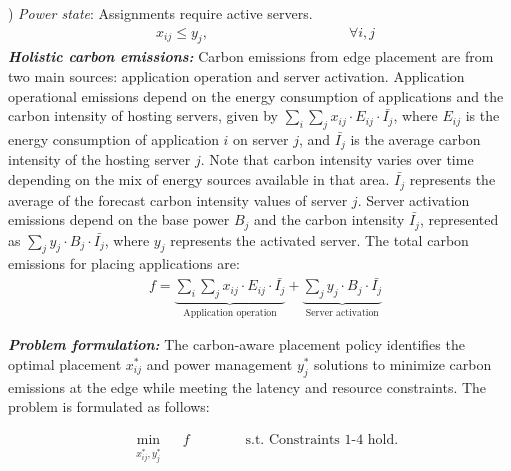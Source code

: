 ) \textit{Power state}: 
Assignments require active servers.  
{\small 
\begin{align}
    \label{eq:server_on}
    & x_{ij} \leq y_j, \quad \quad \quad \quad \quad  \quad \quad \quad \quad \quad \forall i, j 
\end{align}
}
\noindent\emph{\textbf{Holistic carbon emissions:}} Carbon emissions from edge placement are from two main sources: application operation and server activation. Application operational emissions depend on the energy consumption of applications and the carbon intensity of hosting servers, given by $\sum_i \sum_j x_{ij} \cdot E_{ij} \cdot \bar{I_j}$, where $E_{ij}$ is the energy consumption of application $i$ on server $j$, and $\bar{I_j}$ is the average carbon intensity of the hosting server $j$. Note that carbon intensity varies over time depending on the mix of energy sources available in that area. $\bar{I_j}$ represents the average of the forecast carbon intensity values of server $j$. Server activation emissions depend on the base power $B_j$ and the carbon intensity $\bar{I_j}$, represented as $\sum_j y_j \cdot B_{j} \cdot \bar{I_j}$, where $y_j$ represents the activated server. The total carbon emissions for placing applications are: 
{\small 
\begin{align}
    \label{eq:emission}
    & f =  \underbrace{\sum_i \sum_j x_{ij} \cdot E_{ij} \cdot \bar{I_j}}_{\text{Application operation}} + \underbrace{\sum_j y_j \cdot B_j \cdot \bar{I_j}}_{\text{Server activation}}
\end{align}
}

\noindent\emph{\textbf{Problem formulation:}} The carbon-aware placement policy identifies the optimal placement $x_{ij}^*$ and power management $y_j^*$ solutions to minimize carbon emissions at the edge while meeting the latency and resource constraints. The problem is formulated as follows: 

{\small 
\begin{align}
    \label{eq:objective}
    & \min_{\substack{x_{ij}^*, y_j^*}}  \quad f  \quad \quad \quad \quad \text{s.t. Constraints 1-4 hold. }
\end{align}
}

